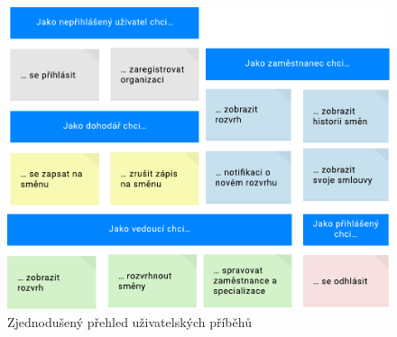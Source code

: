 \documentclass[twoside]{ctuthesis}
\begin{document}
\begin{figure}[h!]
	\includegraphics[scale=0.7]{user-stories.pdf}
	\caption{Zjednodušený přehled uživatelských příběhů}
	\label{fig:user-stories}
\end{figure}
\end{document}
